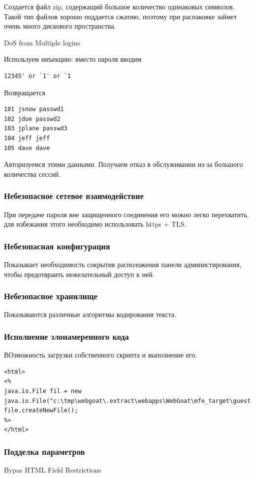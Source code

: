 \documentclass[10pt,a4paper]{article}
\begin{document}
Создается файл zip, содержащий большое количество одинаковых символов. Такой тип файлов хорошо поддается сжатию, поэтому при распаковке займет очень много дискового пространства. 

DoS from Multiple logins

Используем инъекцию: вместо пароля вводим
\begin{verbatim}
12345' or `1' or `1
\end{verbatim}

Возвращается
\begin{verbatim}
101 jsnow passwd1
102 jdoe passwd2
103 jplane passwd3
104 jeff jeff
105 dave dave
\end{verbatim}
Авторизуемся этими данными. Получаем отказ в обслуживании из-за большого количества сессий.

\subsubsection{Небезопасное сетевое взаимодействие}
При передаче пароля вне защищенного соединения его можно легко перехватить, для избежания этого необходимо использовать https + TLS. 

\subsubsection{Небезопасная конфигурация}

Показывает необходимость сокрытия расположения панели администирования, чтобы предотвраить нежелательный доступ к ней.

\subsubsection{Небезопасное хранилище}

Показываются различные алгоритмы кодирования текста.

\subsubsection{Исполнение злонамеренного кода}
ВОзможность загрузки собственного скрипта и выполнение его.
\begin{verbatim}
<html>
<%
java.io.File fil = new java.io.File("c:\tmp\webgoat\.extract\webapps\WebGoat\mfe_target\guest.txt");
file.createNewFile();
%>
</html>
\end{verbatim}

\subsubsection{Подделка параметров}
Bypas HTML Field Restrictions
\end{document}
